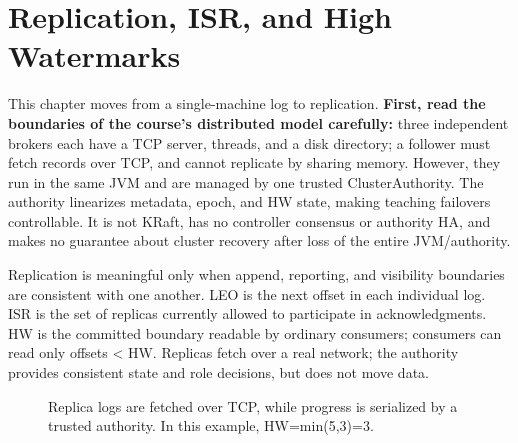 \chapter{Replication, ISR, and High Watermarks}
This chapter moves from a single-machine log to replication. \textbf{First, read the boundaries of the course's distributed model carefully:} three independent brokers each have a TCP server, threads, and a disk directory; a follower must fetch records over TCP, and cannot replicate by sharing memory. However, they run in the same JVM and are managed by one trusted ClusterAuthority. The authority linearizes metadata, epoch, and HW state, making teaching failovers controllable. It is not KRaft, has no controller consensus or authority HA, and makes no guarantee about cluster recovery after loss of the entire JVM/authority.

Replication is meaningful only when append, reporting, and visibility boundaries are consistent with one another. LEO is the next offset in each individual log. ISR is the set of replicas currently allowed to participate in acknowledgments. HW is the committed boundary readable by ordinary consumers; consumers can read only offsets < HW. Replicas fetch over a real network; the authority provides consistent state and role decisions, but does not move data.

\begin{figure}[ht]
\centering
{}
\caption{Replica logs are fetched over TCP, while progress is serialized by a trusted authority. In this example, HW=min(5,3)=3.}
\end{figure}

